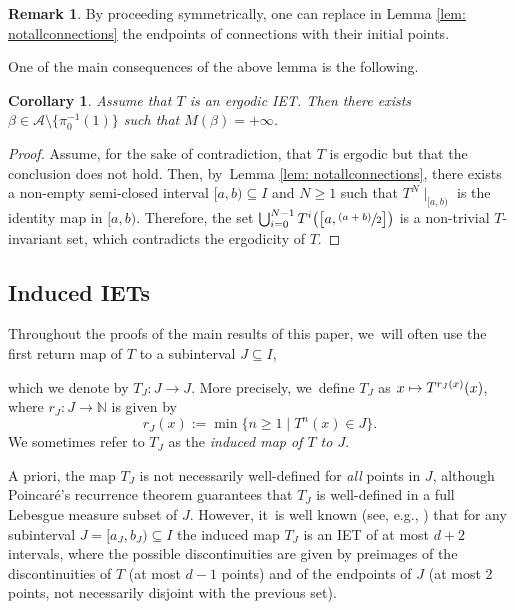 \documentclass[JEP,XML,SOM,Unicode,NoEqCountersInSection,NoFloatCountersInSection,published]{cedram}
\newcommand{\psfrac}[2]{\sfrac{(#1)}{#2}}
\newcommand\mto{\mathchoice{\longmapsto}{\mapsto}{\mapsto}{\mapsto}}
\theoremstyle{plain}
\newtheorem{corollary}[theorem]{Corollary}
\theoremstyle{definition}
\newtheorem{remark}[theorem]{Remark}
\newcommand{\N}{\mathbb{N}}
\begin{document}
{\begin{remark}
By proceeding symmetrically, one can replace in Lemma \ref{lem: notallconnections} the endpoints of connections with their initial points.
\end{remark}

One of the main consequences of the above lemma is the following.

\skpt
\begin{corollary}\label{cor: existenceofinfiniteorbit}
Assume that $T$ is an ergodic IET. Then there exists {$\beta \in\mathcal A \setminus \{\pi_0^{-1}(1)\}$ such that $M(\beta) = +\infty$. }
\end{corollary}

\begin{proof}
Assume, for the sake of contradiction, that $T$ is ergodic but that the conclusion does not hold. Then, by~Lemma \ref{lem: notallconnections}, there exists a non-empty semi-closed interval $[a, b) \subseteq I$ and $N \geq 1$ such that $T^N\mid_{[a, b)}$ is the identity map in $[a, b)$. Therefore, the set $\bigcup_{i = 0}^{N - 1} T^i\big( \big[a, \psfrac{a + b}{2}\big]\big)$ is a non-trivial $T$-invariant set, which contradicts the ergodicity of $T$.
\end{proof}

\subsection{Induced IETs}\label{sc:induced_IETs}
Throughout the proofs of the main results of this paper, we~will often use the first return map of $T$ to a subinterval $J \subseteq I$, {which we denote by $T_J: J \to J$. More precisely, we~define $T_J$ as $x \mto T^{r_J(x)}(x)$, where $r_J: J \to \N$ is given by
\[
 r_J(x):= \min\{n \geq 1 \mid T^n(x) \in J\}.
\]
We sometimes refer to $T_J$ as the \emph{induced map of $T$ to $J$}.

A priori, the map $T_J$ is not necessarily well-defined for \emph{all} points in $J$, although Poincaré's recurrence theorem guarantees that $T_J$ is well-defined in a full Lebesgue measure subset of $J$. However, it~is well known (see, e.g., \cite[\S 3]{veech_interval_1978}) that for any subinterval $J=[a_J,b_J)\subseteq I$ the induced map $T_J$ is an IET of at most $d+2$ intervals, where the possible discontinuities are given by preimages of the discontinuities of $T$ (at most $d - 1$ points) and of the endpoints of $J$ (at most $2$ points, not necessarily disjoint with the previous set).

}}
\end{document}
